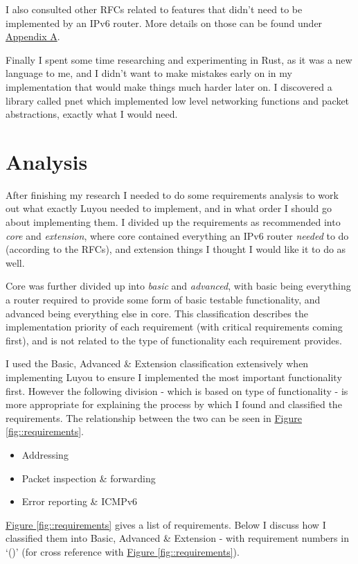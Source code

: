 \documentclass[12pt,a4paper,twoside,openany]{report}
\begin{document}
I also consulted other RFCs related to features that didn't need to be implemented by an IPv6 router\cite{dhcpv6_rfc}\cite{slaac_rfc}\cite{ndp_rfc}. More details on those can be found under \hyperref[appendix::requirements]{Appendix A}.

\bigskip

Finally I spent some time researching and experimenting in Rust\cite{rust}, as it was a new language to me, and I didn't want to make mistakes early on in my implementation that would make things much harder later on.  I discovered a library called pnet\cite{pnet_rust} which implemented low level networking functions and packet abstractions, exactly what I would need.

\section{Analysis}
\label{sec::analysis}

After finishing my research I needed to do some requirements analysis to work out what exactly Luyou needed to implement, and in what order I should go about implementing them.  I divided up the requirements as recommended into \textit{core} and \textit{extension}, where core contained everything an IPv6 router \textit{needed} to do (according to the RFCs), and extension things I thought I would like it to do as well.  

Core was further divided up into \textit{basic} and \textit{advanced}, with basic being everything a router required to provide some form of basic testable functionality, and advanced being everything else in core.  This classification describes the implementation priority of each requirement (with critical requirements coming first), and is not related to the type of functionality each requirement provides.

\bigskip

I used the Basic, Advanced \& Extension classification extensively when implementing Luyou to ensure I implemented the most important functionality first. However the following division - which is based on type of functionality - is more appropriate for explaining the process by which I found and classified the requirements. The relationship between the two can be seen in \hyperref[fig::requirements]{Figure }\ref{fig::requirements}.
\begin{itemize}
\item Addressing
\item Packet inspection \& forwarding
\item Error reporting \& ICMPv6\cite{icmpv6_rfc}
\end{itemize}
\hyperref[fig::requirements]{Figure }\ref{fig::requirements} gives a list of requirements. Below I discuss how I classified them into Basic, Advanced \& Extension - with requirement numbers in `()' (for cross reference with \hyperref[fig::requirements]{Figure }\ref{fig::requirements}). 
\end{document}
